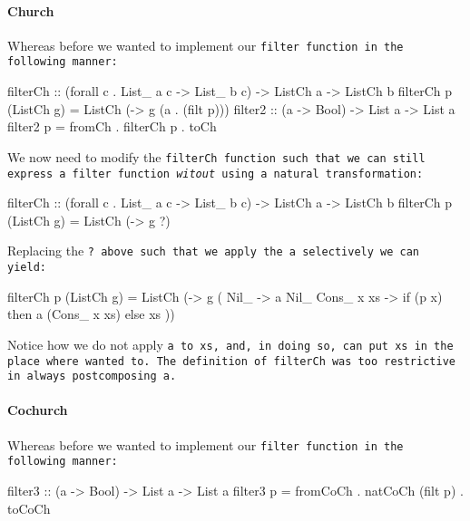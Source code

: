 \paragraph{Church}
Whereas before we wanted to implement our \tt{filter} function in the following manner:
\begin{code}
filterCh :: (forall c . List_ a c -> List_ b c) -> ListCh a -> ListCh b
filterCh p (ListCh g) = ListCh (\a -> g (a . (filt p)))
filter2 :: (a -> Bool) -> List a -> List a
filter2 p = fromCh . filterCh p . toCh
\end{code}
We now need to modify the \tt{filterCh} function such that we can still express a filter function \textit{witout} using a natural transformation:
\begin{code}
filterCh :: (forall c . List_ a c -> List_ b c) -> ListCh a -> ListCh b
filterCh p (ListCh g) = ListCh (\a -> g ?)
\end{code}
Replacing the \tt{?} above such that we apply the \tt{a} selectively we can yield:
\begin{code}
filterCh p (ListCh g) = ListCh (\a -> g (\case
    Nil_ -> a Nil_
    Cons_ x xs -> if (p x) then a (Cons_ x xs) else xs
  ))
\end{code}
Notice how we do not apply \tt{a} to \tt{xs}, and, in doing so, can put \tt{xs} in the place where wanted to.
The definition of \tt{filterCh} was too restrictive in always postcomposing \tt{a}.


\paragraph{Cochurch}
Whereas before we wanted to implement our \tt{filter} function in the following manner:
\begin{code}
filter3 :: (a -> Bool) -> List a -> List a
filter3 p = fromCoCh . natCoCh (filt p) . toCoCh
\end{code}


